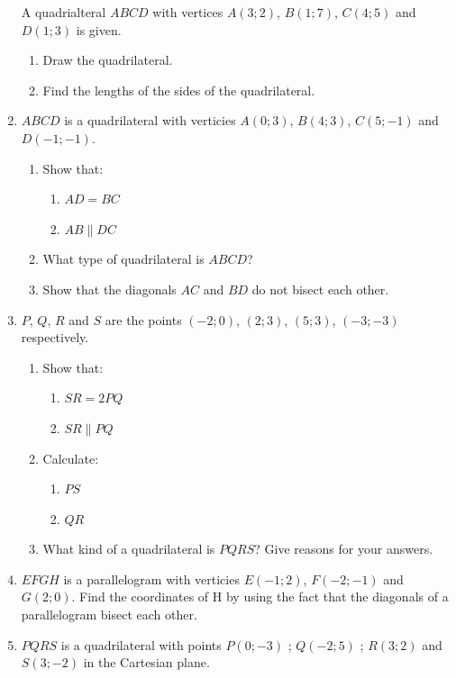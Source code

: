 \begin{eocexercises}{}
\begin{enumerate}[noitemsep, label=\textbf{\arabic*}. ]
A quadrialteral $ABCD$ with vertices $A(3;2)$, $B(1;7)$, $C(4;5)$ and $D(1;3)$ is given.
\begin{enumerate}[noitemsep, label=\textbf{\alph*}. ] 
\item  Draw the quadrilateral.
\item  Find the lengths of the sides of the quadrilateral.
\end{enumerate}
\item $ABCD$ is a quadrilateral with verticies $A(0;3)$, $B(4;3)$, $C(5;-1)$ and $D(-1;-1)$.
\begin{enumerate}[noitemsep, label=\textbf{\alph*}. ] 
\item Show that:
\begin{enumerate}[noitemsep, label=\textbf{\roman*}. ] 
\item $AD = BC$
\item $AB \parallel DC$
\end{enumerate}
\item What type of quadrilateral is $ABCD$?
\item Show that the diagonals $AC$ and $BD$ do not bisect each other.
\end{enumerate}
\item $P$, $Q$, $R$ and $S$ are the points $(-2;0)$, $(2;3)$, $(5;3)$, $(-3;-3)$ respectively.
\begin{enumerate}[noitemsep, label=\textbf{\alph*}. ] 
\item Show that:
\begin{enumerate}[noitemsep, label=\textbf{\roman*}. ] 
\item $SR = 2PQ$
\item $SR \parallel PQ$
\end{enumerate}
\item Calculate:
\begin{enumerate}[noitemsep, label=\textbf{\roman*}. ] 
\item $PS$
\item $QR$
\end{enumerate}
\item What kind of a quadrilateral is $PQRS$? Give reasons for your answers.
\end{enumerate}
\item $EFGH$ is a parallelogram with verticies $E(-1;2)$, $F(-2;-1)$ and $G(2;0)$. Find the coordinates of H by using the fact that the diagonals of a parallelogram bisect each other.\newline
\item  
$PQRS$ is a quadrilateral with points $P(0;-3)$ ; $Q(-2;5)$ ; $R(3;2)$ and $S(3;-2)$  in the Cartesian plane.

\end{enumerate}
\end{eocexercises}
